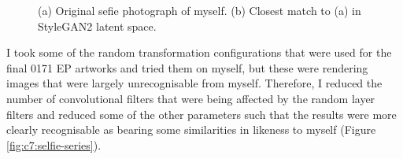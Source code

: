 \begin{figure}[!htbp]
    \hfill
    \hfill
    \caption[Selfie and latent projected into StyleGAN2 latent space comparison]{(a) Original sefie photograph of myself. (b) Closest match to (a) in StyleGAN2 latent space.}
    \label{fig:c7:selfie}
 \end{figure}

I took some of the random transformation configurations that were used for the final 0171 EP artworks and tried them on myself, but these were rendering images that were largely unrecognisable from myself. 
Therefore, I reduced the number of convolutional filters that were being affected by the random layer filters and reduced some of the other parameters such that the results were more clearly recognisable as bearing some similarities in likeness to myself (Figure \ref{fig:c7:selfie-series}).


